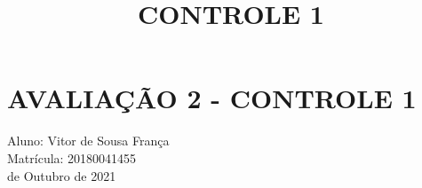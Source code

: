\documentclass{article}
\title{CONTROLE 1}
\begin{document}
\section*{AVALIAÇÃO 2 - CONTROLE 1}

\indent Aluno: Vitor de Sousa França\\
\indent Matrícula: 20180041455\\
 de Outubro de 2021\\


\end{document}
